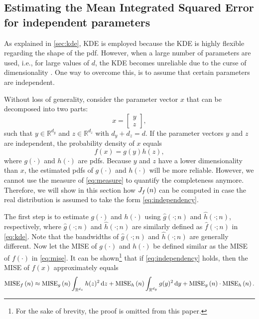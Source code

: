 \subsection{Estimating the Mean Integrated Squared Error for independent parameters}
\label{sec:mise independent}

As explained in \cref{sec:kde}, KDE is employed because the KDE is highly flexible regarding the shape of the pdf. However, when a large number of parameters are used, i.e., for large values of $d$, the KDE becomes unreliable due to the curse of dimensionality \cite{scott2015multivariate}. One way to overcome this, is to assume that certain parameters are independent. 

Without loss of generality, consider the parameter vector $x$ that can be decomposed into two parts:
\begin{equation}
	\label{eq:combine}
	x = \begin{bmatrix}
		y \\ z
	\end{bmatrix},
\end{equation}
such that $y \in \mathbb{R}^{d_y}$ and $z \in \mathbb{R}^{d_z}$ with $d_y+d_z=d$. If the parameter vectors $y$ and $z$ are independent, the probability density of $x$ equals
\begin{equation}
	\label{eq:independency}
	f(x) = g(y) h(z),
\end{equation}
where $g(\cdot)$ and $h(\cdot)$ are pdfs.
Because $y$ and $z$ have a lower dimensionality than $x$, the estimated pdfs of $g(\cdot)$ and $h(\cdot)$ will be more reliable. However, we cannot use the measure of \cref{eq:measure} to quantify the completeness anymore. Therefore, we will show in this section how $J_{f} \left( n \right)$ can be computed in case the real distribution is assumed to take the form \cref{eq:independency}.

The first step is to estimate $g(\cdot)$ and $h(\cdot)$ using $\hat{g}(\cdot;n)$ and $\hat{h}(\cdot;n)$, respectively, where $\hat{g}(\cdot;n)$ and $\hat{h}(\cdot;n)$ are similarly defined as $\hat{f}(\cdot;n)$ in \cref{eq:kde}. Note that the bandwidths of $\hat{g}(\cdot;n)$ and $\hat{h}(\cdot;n)$ are generally different. Now let the MISE of $g(\cdot)$ and $h(\cdot)$ be defined similar as the MISE of $f(\cdot)$ in \cref{eq:mise}. It can be shown\footnote{For the sake of brevity, the proof is omitted from this paper.} that if \cref{eq:independency} holds, then the MISE of $f(x)$ approximately equals
\begin{dmath}
	\label{eq:mise independent}
	\mise{f}{n} \approx \mise{g}{n} \int_{\mathbb{R}^{d_z}} h(z)^2 \ud z + \mise{h}{n} \int_{\mathbb{R}^{d_y}} g(y)^2 \ud y + \mise{g}{n} \cdot \mise{h}{n}.
\end{dmath}

